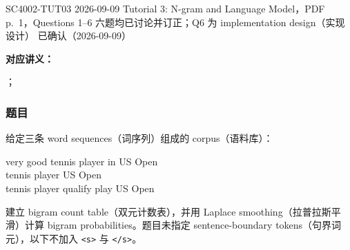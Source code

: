 
\label{tutorial:SC4002-TUT03}

\tutorialmeta
  {SC4002-TUT03}
  {2026-09-09}
  {Tutorial 3: N-gram and Language Model，PDF p.~1，Questions 1--6}
  {六题均已讨论并订正；Q6 为 implementation design（实现设计）}
  {已确认（2026-09-09）}


\textbf{对应讲义：}\par
{}；\par
{}

\subsubsection*{题目}

给定三条 word sequences（词序列）组成的 corpus（语料库）：
\begin{center}
\ttfamily
very good tennis player in US Open\\
tennis player US Open\\
tennis player qualify play US Open
\end{center}
建立 bigram count table（双元计数表），并用 Laplace smoothing（拉普拉斯平滑）计算 bigram probabilities。题目未指定 sentence-boundary tokens（句界词元），以下不加入 \texttt{<s>} 与 \texttt{</s>}。

